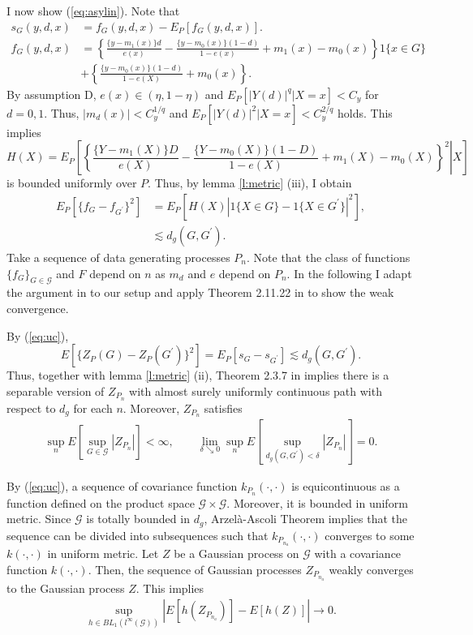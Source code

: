 \documentclass[12pt,oneside,reqno,english]{amsart}
\theoremstyle{definition}
\begin{document}
I now show (\ref{eq:asylin}). Note that 
\begin{align*}
s_{G}(y,d,x)&=f_{G}(y,d,x)-E_{P}[f_{G}(y,d,x)].\\
f_{G}(y,d,x)&=\left\{\frac{\{y-m_{1}(x)\}d}{e(x)}-\frac{\{y-m_{0}(x)\}(1-d)}{1-e(x)}+m_{1}(x)-m_{0}(x)\right\}1\{x\in G\}\\
&+\left\{\frac{\{y-m_{0}(x)\}(1-d)}{1-e(X)}+m_{0}(x)\right\}.
\end{align*}
By assumption D, $e(x)\in (\eta,1-\eta)$ and $E_{P}[|Y(d)|^{q}|X=x]<C_{y}$ for $d=0,1$. 
Thus, $|m_{d}(x)|<C_{y}^{1/q}$ and $E_{P}[|Y(d)|^{2}|X=x]<C_{y}^{2/q}$ holds. This implies  
\[H(X)=E_{P}\left[\left. \left\{\frac{\{Y-m_{1}(X)\}D}{e(X)}-\frac{\{Y-m_{0}(X)\}(1-D)}{1-e(X)}+m_{1}(X)-m_{0}(X)\right\}^{2}\right| X\right]\]
is bounded uniformly over $P$. Thus, by lemma \ref{l:metric} (iii), I obtain 
\begin{align}
E_{P}[\{f_{G}-f_{G^{\prime}}\}^{2}]&=E_{P}[H(X)|1\{X\in G\}-1\{X\in G^{\prime}\}|^{2}],\nonumber\\
&\lesssim d_{g}(G,G^{\prime}).\label{eq:uc}
\end{align}
Take a sequence of data generating processes $P_{n}$. 
Note that the class of functions $\{f_{G}\}_{G\in \mathcal{G}}$ and $F$ depend on $n$ as $m_{d}$ and $e$ depend on $P_{n}$. 
In the following I adapt the argument in \cite{BCFH:17} to our setup and apply Theorem 2.11.22 in \cite{VW:96} to show the weak convergence. 

By (\ref{eq:uc}), 
\[E[\{Z_{P}(G)-Z_{P}(G^{\prime})\}^{2}]=E_{P}[s_{G}-s_{G^{\prime}}]\lesssim d_{g}(G,G^{\prime}).\]
Thus, together with lemma \ref{l:metric} (ii), Theorem 2.3.7 in \cite{GN:15} implies 
 there is a separable version of $Z_{P_{n}}$ with almost surely uniformly continuous path with respect to $d_{g}$ for each $n$. 
 Moreover, $Z_{P_{n}}$ satisfies 
\begin{align*}
\sup_{n}E\left[\sup_{G\in \mathcal{G}} |Z_{P_{n}}|\right]<\infty, \qquad
\lim_{\delta\searrow 0}\sup_{n}E\left[\sup_{d_{g}(G,G^{\prime})<\delta} \left|Z_{P_{n}}\right|\right]=0.
\end{align*}


By (\ref{eq:uc}), a sequence of covariance function $k_{P_{n}}(\cdot,\cdot)$ is equicontinuous as a function defined on the product space $\mathcal{G}\times \mathcal{G}$. Moreover, it is bounded in uniform metric. Since $\mathcal{G}$ is totally bounded in $d_{g}$, Arzel\`a-Ascoli Theorem implies that the sequence can be divided into subsequences such that  $k_{P_{n_{a}}}(\cdot,\cdot)$ converges to some $k(\cdot,\cdot)$ in uniform metric. Let $Z$ be a Gaussian process on $\mathcal{G}$ with a covariance function $k(\cdot,\cdot)$.  Then, the sequence of  
Gaussian processes $Z_{P_{n_{a}}}$ weakly converges to the Gaussian process $Z$.
This implies  
\begin{align*}
\sup_{h\in BL_{1}(l^{\infty}(\mathcal{G}))}\left|E[h(Z_{P_{n_{a}}})]-E[h(Z)]\right|\rightarrow 0. 
\end{align*}
\end{document}
